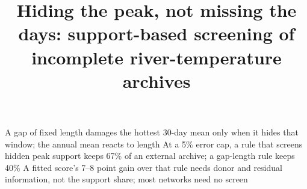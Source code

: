 \documentclass[draft]{agujournal2025}
\begin{document}

\title{Hiding the peak, not missing the days: support-based screening of
incomplete river-temperature archives}


\keypoints
  {A gap of fixed length damages the hottest 30-day mean only when it hides that window; the annual mean reacts to length}
  {At a 5\% error cap, a rule that screens hidden peak support keeps 67\% of an external archive; a gap-length rule keeps 40\%}
  {A fitted score's 7--8 point gain over that rule needs donor and residual information, not the support share; most networks need no screen}

\maketitle
\end{document}
